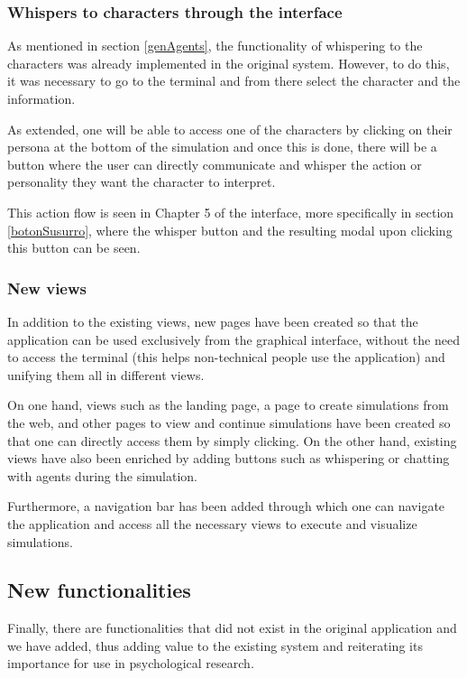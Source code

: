 \subsubsection*{Whispers to characters through the interface}
As mentioned in section \ref{genAgents}, the functionality of whispering to the characters was already implemented in the original system. However, to do this, it was necessary to go to the terminal and from there select the character and the information.

As extended, one will be able to access one of the characters by clicking on their persona at the bottom of the simulation and once this is done, there will be a button where the user can directly communicate and whisper the action or personality they want the character to interpret.

This action flow is seen in Chapter 5 of the interface, more specifically in section \ref{botonSusurro}, where the whisper button and the resulting modal upon clicking this button can be seen.

\subsubsection*{New views}
In addition to the existing views, new pages have been created so that the application can be used exclusively from the graphical interface, without the need to access the terminal (this helps non-technical people use the application) and unifying them all in different views.

On one hand, views such as the landing page, a page to create simulations from the web, and other pages to view and continue simulations have been created so that one can directly access them by simply clicking. On the other hand, existing views have also been enriched by adding buttons such as whispering or chatting with agents during the simulation.

Furthermore, a navigation bar has been added through which one can navigate the application and access all the necessary views to execute and visualize simulations.

\subsection*{New functionalities}
Finally, there are functionalities that did not exist in the original application and we have added, thus adding value to the existing system and reiterating its importance for use in psychological research.

